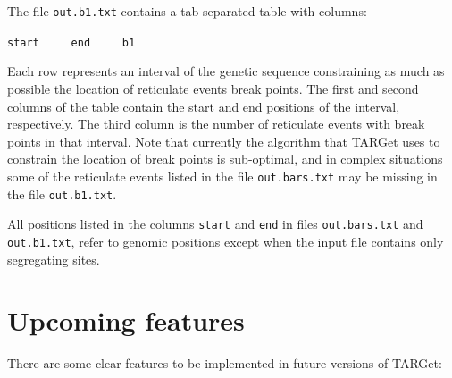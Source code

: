 \documentclass[12pt]{article}
\begin{document}
The file \texttt{out.b1.txt} contains a tab separated table with columns:

\texttt{start\ \ \ \ \ end\ \ \ \ \ b1}

\noindent Each row represents an interval of the genetic sequence constraining as much as possible the location of reticulate events break points. The first and second columns of the table contain the start and end positions of the interval, respectively. The third column is the number of reticulate events with break points in that interval. Note that currently the algorithm that TARGet uses to constrain the location of break points is sub-optimal, and in complex situations some of the reticulate events listed in the file \texttt{out.bars.txt} may be missing in the file \texttt{out.b1.txt}.

All positions listed in the columns \texttt{start} and \texttt{end} in files \texttt{out.bars.txt} and \texttt{out.b1.txt}, refer to genomic positions except when the input file contains only segregating sites.

\section{Upcoming features}

There are some clear features to be implemented in future versions of TARGet:
\end{document}
